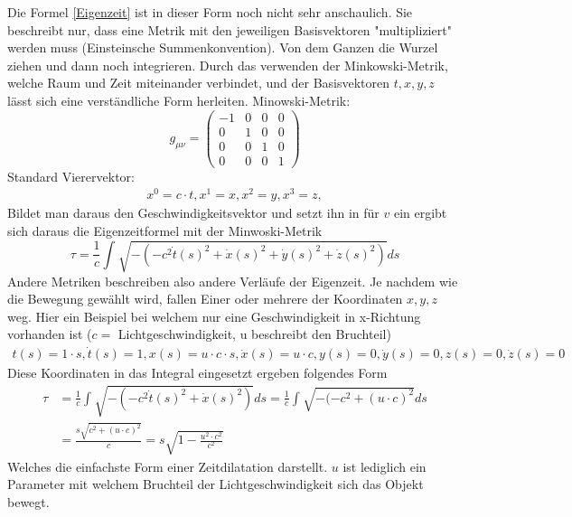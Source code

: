 \begin{refsection}
Die Formel \ref{Eigenzeit} ist in dieser Form noch nicht sehr anschaulich. Sie beschreibt nur, dass eine Metrik mit den jeweiligen Basisvektoren "multipliziert" werden muss (Einsteinsche Summenkonvention). Von dem Ganzen die Wurzel ziehen und dann noch integrieren.
Durch das verwenden der Minkowski-Metrik, welche Raum und Zeit miteinander verbindet, und der Basisvektoren $t, x, y, z$ l\"asst sich eine verst\"andliche Form herleiten. 
Minowski-Metrik:
\begin{equation}
    g_{\mu\nu}=
    \begin{pmatrix}
        -1 & 0 & 0 & 0 \\
        0 & 1 & 0 & 0 \\
        0 & 0 & 1 & 0 \\
        0 & 0 & 0 & 1
    \end{pmatrix}
\end{equation}
Standard Vierervektor:
\begin{align*}
    x^{0}=c \cdot t,
    x^{1}=x,
    x^{2}=y,
    x^{3}=z,
\end{align*}
Bildet man daraus den Geschwindigkeitsvektor und setzt ihn in für $v$ ein ergibt sich daraus die Eigenzeitformel mit der Minwoski-Metrik
\begin{equation}
    \tau
    =
    \frac{1}{c}\int_{}^{}\sqrt{-(-c^2\dot{t}(s)^{2}+\dot{x}(s)^{2}+\dot{y}(s)^{2}+\dot{z}(s)^{2})}ds
\end{equation}
Andere Metriken beschreiben also andere Verläufe der Eigenzeit. 
Je nachdem wie die Bewegung gew\"ahlt wird, fallen Einer oder mehrere der Koordinaten $x, y, z$ weg.
Hier ein Beispiel bei welchem nur eine Geschwindigkeit in x-Richtung vorhanden ist ($c =$ Lichtgeschwindigkeit, u beschreibt den Bruchteil)
\begin{align*}
     t(s)=1\cdot s, \dot{t}(s)=1,
 	 x(s)=u\cdot c \cdot s, \dot{x}(s)=u\cdot c,
     y(s)=0, \dot{y}(s)=0,
     z(s)=0, \dot{z}(s)=0
\end{align*}
Diese Koordinaten in das Integral eingesetzt ergeben folgendes Form
\begin{align*}
    \tau
    &=
    \frac{1}{c}\int_{}^{}\sqrt{-(-c^2\dot{t}(s)^2+\dot{x}(s)^2)}ds 
    =
    \frac{1}{c}\int_{}^{}\sqrt{-(-c^2 +(u\cdot c)^{2}}ds\\
    &=
    \frac{s\sqrt{c^2+(u\cdot c)^{2}}}{c} 
    =
    s\sqrt{1-\frac{u^2\cdot c^2}{c^2}}
\end{align*}
Welches die einfachste Form einer Zeitdilatation darstellt. $u$  ist lediglich ein Parameter mit welchem Bruchteil der Lichtgeschwindigkeit sich das Objekt bewegt.

\end{refsection}

